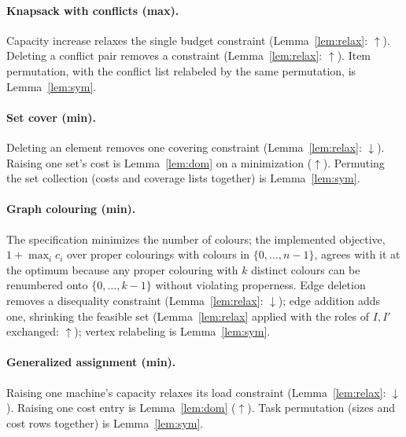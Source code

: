 \documentclass[pdflatex,sn-mathphys-num]{sn-jnl}
\theoremstyle{thmstyleone}
\theoremstyle{thmstyletwo}
\begin{document}
\begin{appendices}
\paragraph{Knapsack with conflicts (max).}
Capacity increase relaxes the single budget constraint
(Lemma~\ref{lem:relax}: $\uparrow$). Deleting a conflict pair removes
a constraint (Lemma~\ref{lem:relax}: $\uparrow$). Item permutation,
with the conflict list relabeled by the same permutation, is
Lemma~\ref{lem:sym}.

\paragraph{Set cover (min).}
Deleting an element removes one covering constraint
(Lemma~\ref{lem:relax}: $\downarrow$). Raising one set's cost is
Lemma~\ref{lem:dom} on a minimization ($\uparrow$). Permuting the set
collection (costs and coverage lists together) is Lemma~\ref{lem:sym}.

\paragraph{Graph colouring (min).}
The specification minimizes the number of colours; the implemented
objective, $1 + \max_i c_i$ over proper colourings with colours in
$\{0, \dots, n-1\}$, agrees with it at the optimum because any proper
colouring with $k$ distinct colours can be renumbered onto
$\{0, \dots, k-1\}$ without violating properness. Edge deletion
removes a disequality constraint (Lemma~\ref{lem:relax}:
$\downarrow$); edge addition adds one, shrinking the feasible set
(Lemma~\ref{lem:relax} applied with the roles of $I, I'$ exchanged:
$\uparrow$); vertex relabeling is Lemma~\ref{lem:sym}.

\paragraph{Generalized assignment (min).}
Raising one machine's capacity relaxes its load constraint
(Lemma~\ref{lem:relax}: $\downarrow$). Raising one cost entry is
Lemma~\ref{lem:dom} ($\uparrow$). Task permutation (sizes and cost
rows together) is Lemma~\ref{lem:sym}.


\end{appendices}
\end{document}
